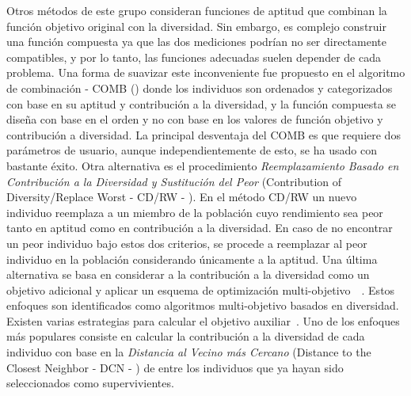 Otros métodos de este grupo consideran funciones de aptitud que combinan la función objetivo original con la diversidad.
%
Sin embargo, es complejo construir una función compuesta ya que las dos mediciones podrían no ser directamente compatibles,
y por lo tanto, las funciones adecuadas suelen depender de cada problema.
%
Una forma de suavizar este inconveniente fue propuesto en el algoritmo de combinación - COMB (\cite{vidal2013hybrid}) donde los individuos son ordenados y categorizados con base en su aptitud y contribución a la diversidad, y la función compuesta se diseña con base en el orden y no con base en los valores de función objetivo y contribución a diversidad.
%
La principal desventaja del COMB es que requiere dos parámetros de usuario, aunque independientemente de esto, se ha usado con bastante éxito.
%
Otra alternativa es el procedimiento \textit{Reemplazamiento Basado en Contribución a la Diversidad y Sustitución del Peor} 
(Contribution of Diversity/Replace Worst - CD/RW - \cite{lozano2008replacement}).
%
En el método CD/RW un nuevo individuo reemplaza a un miembro de la población cuyo rendimiento sea peor tanto en aptitud como en contribución a la diversidad.
%
En caso de no encontrar un peor individuo bajo estos dos criterios, se procede a reemplazar al peor individuo en la población considerando únicamente a la aptitud.
%
Una última alternativa se basa en considerar a la contribución a la diversidad como un objetivo adicional y aplicar un esquema de 
optimización multi-objetivo~\cite{bui2005multiobjective}~\cite{mouret2011novelty}.
%
Estos enfoques son identificados como algoritmos multi-objetivo basados en diversidad.
%
Existen varias estrategias para calcular el objetivo auxiliar~\cite{segura2013using}.
%
Uno de los enfoques más populares consiste en calcular la contribución a la diversidad de cada individuo con base en 
la \textit{Distancia al Vecino más Cercano} (Distance to the Closest Neighbor - DCN - \cite{segura2016novel}) de entre los individuos que ya hayan sido seleccionados
como supervivientes.

